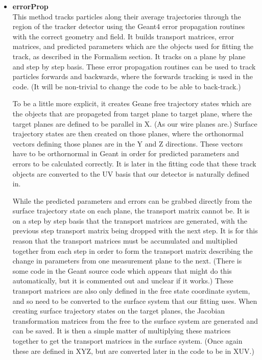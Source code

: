 \documentclass{article}
\begin{document}
\begin{enumerate}
\begin{itemize}
          \item{\bf{errorProp}} \\ 
          This method tracks particles along their average trajectories through the region of the tracker detector using the Geant4 error propagation routines with the correct geometry and field. It builds transport matrices, error matrices, and predicted parameters which are the objects used for fitting the track, as described in the Formalism section. It tracks on a plane by plane and step by step basis. These error propagation routines can be used to track particles forwards and backwards, where the forwards tracking is used in the code. (It will be non-trivial to change the code to be able to back-track.) 

          To be a little more explicit, it creates Geane free trajectory states which are the objects that are propageted from target plane to target plane, where the target planes are defined to be parallel in X. (As our wire planes are.) Surface trajectory states are then created on those planes, where the orthonormal vectors defining those planes are in the Y and Z directions. These vectors have to be orthornormal in Geant in order for predicted parameters and errors to be calculated correctly. It is later in the fitting code that these track objects are converted to the UV basis that our detector is naturally defined in. 
            
          While the predicted parameters and errors can be grabbed directly from the surface trajectory state on each plane, the transport matrix cannot be. It is on a step by step basis that the transport matrices are generated, with the previous step transport matrix being dropped with the next step. It is for this reason that the transport matrices must be accumulated and multiplied together from each step in order to form the transport matrix describing the change in parameters from one measurement plane to the next. (There is some code in the Geant source code which appears that might do this automatically, but it is commented out and unclear if it works.) These transport matrices are also only defined in the free state coordinate system, and so need to be converted to the surface system that our fitting uses. When creating surface trajectory states on the target planes, the Jacobian transformation matrices from the free to the surface system are generated and can be saved. It is then a simple matter of multiplying these matrices together to get the transport matrices in the surface system. (Once again these are defined in XYZ, but are converted later in the code to be in XUV.)


\end{itemize}
\end{enumerate}
\end{document}

